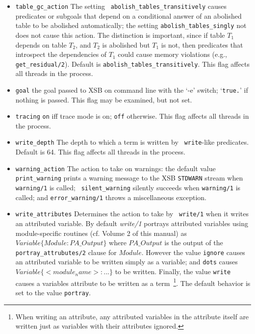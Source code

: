 \begin{description}
\begin{itemize}
%
\item {\tt table\_gc\_action} The setting {\tt
  abolish\_tables\_transitively} causes predicates or subgoals that
  depend on a conditional answer of an abolished table to be abolished
  automatically; the setting {\tt abolish\_tables\_singly} not does
  not cause this action.  The distinction is important, since if table
  $T_1$ depends on table $T_2$, and $T_2$ is abolished but $T_1$ is
  not, then predicates that introspect the dependencies of $T_1$ could
  cause memory violations (e.g., {\tt get\_residual/2}).  Default is
  {\tt abolish\_tables\_transitively}.  This flag affects all threads
  in the process.
%
\item {\tt goal}  the goal passed to XSB on command line with the `-e'
switch; `{\tt true.}' if nothing is passed.  This flag may be
examined, but not set. 
%
\item {\tt tracing}  {\tt on} iff trace mode is on; {\tt off}
otherwise. This flag affects all threads in the process. 
%
\item {\tt write\_depth}  The depth to which a term is written by {\tt
  write}-like predicates.  Default is 64.  This flag affects all
threads in the process.  

\item {\tt warning\_action} The action to take on warnings: the
  default value {\tt print\_warning} prints a warning message to the
  XSB {\tt STDWARN} stream when {\tt warning/1} is called; {\tt
    silent\_warning} silently succeeds when {\tt warning/1} is called;
  and {\tt error\_warning/1} throws a miscellaneous exception.

\item {\tt write\_attributes} Determines the action to take by {\tt
  write/1} when it writes an attributed variable.  By default {\em
  write/1} portrays attributed variables using module-specific
  routines (cf. Volume 2 of this manual) as $Variable \{ Module :
  PA\_Output\}$ where $PA\_Output$ is the output of the {\tt
    portray\_attrubutes/2} clause for $Module$.  However the value
  {\tt ignore} causes an attributed variable to be written simply as a
  variable; and {\tt dots} causes $Variable \{ <module_name> : ...\}$
  to be written.  Finally, the value {\tt write} causes a variables
  attribute to be written as a term~\footnote{When writing an
    attribute, any attributed variables in the attribute itself are
    written just as variables with their attributes ignored.}.  The
  default behavior is set to the value {\tt portray}.


\end{itemize}
\end{description}
